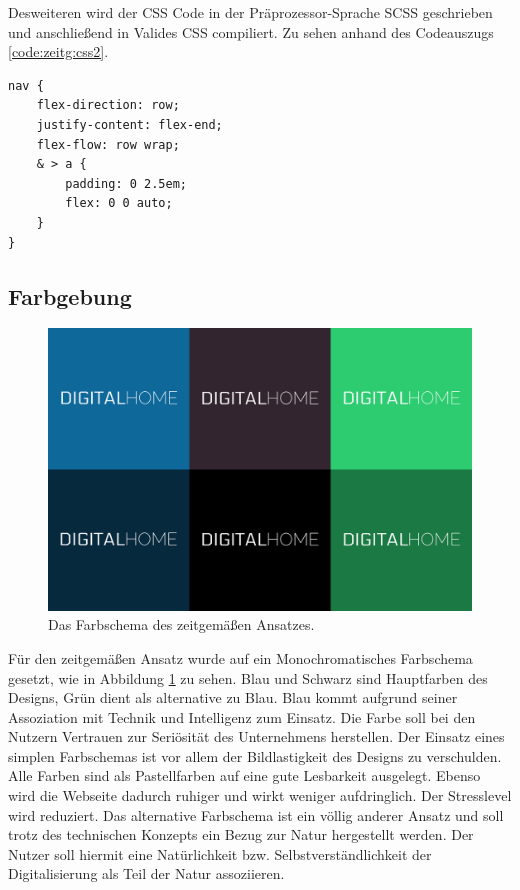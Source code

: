 Desweiteren wird der CSS Code in der Präprozessor-Sprache SCSS geschrieben und anschließend in Valides CSS compiliert. Zu sehen anhand des Codeauszugs \ref{code:zeitg:css2}.

\begin{lstlisting}[caption=Verschachtelung von CSS-Klassen in SCSS., label=code:zeitg:css2]
nav {
	flex-direction: row;
	justify-content: flex-end;
	flex-flow: row wrap;
	& > a {
		padding: 0 2.5em;
		flex: 0 0 auto;
	}
}
\end{lstlisting}

\subsection{Farbgebung}
\begin{figure} [hp]
	\includegraphics[width=\textwidth]{./img/zeitg_farbschema1.png}
	\caption{Das Farbschema des zeitgemäßen Ansatzes.}
	\label{zeitg:farbschema}
\end{figure}

Für den zeitgemäßen Ansatz wurde auf ein Monochromatisches Farbschema gesetzt, wie in Abbildung \ref{zeitg:farbschema} zu sehen. Blau und Schwarz sind Hauptfarben des Designs, Grün dient als alternative zu Blau.
Blau kommt aufgrund seiner Assoziation mit Technik und Intelligenz zum Einsatz. Die Farbe soll bei den Nutzern Vertrauen zur Seriösität des Unternehmens herstellen. Der Einsatz eines simplen Farbschemas ist vor allem der Bildlastigkeit des Designs zu verschulden.
Alle Farben sind als Pastellfarben auf eine gute Lesbarkeit ausgelegt. Ebenso wird die Webseite dadurch ruhiger und wirkt weniger aufdringlich. Der Stresslevel wird reduziert.
Das alternative Farbschema ist ein völlig anderer Ansatz und soll trotz des technischen Konzepts ein Bezug zur Natur hergestellt werden. Der Nutzer soll hiermit eine Natürlichkeit bzw. Selbstverständlichkeit der Digitalisierung als Teil der Natur assoziieren.

